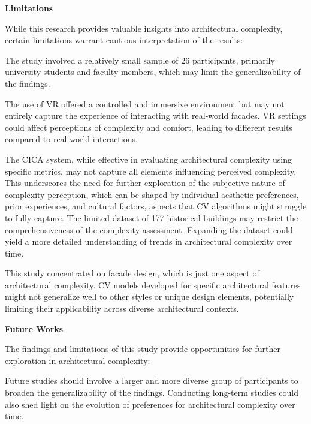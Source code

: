 \textbf{Limitations}

While this research provides valuable insights into architectural complexity, certain limitations warrant cautious interpretation of the results:

The study involved a relatively small sample of 26 participants, primarily university students and faculty members, which may limit the generalizability of the findings.

The use of VR offered a controlled and immersive environment but may not entirely capture the experience of interacting with real-world facades.
VR settings could affect perceptions of complexity and comfort, leading to different results compared to real-world interactions.

The CICA system, while effective in evaluating architectural complexity using specific metrics, may not capture all elements influencing perceived complexity.
This underscores the need for further exploration of the subjective nature of complexity perception, which can be shaped by individual aesthetic preferences, prior experiences, and cultural factors, aspects that CV algorithms might struggle to fully capture.
The limited dataset of 177 historical buildings may restrict the comprehensiveness of the complexity assessment.
Expanding the dataset could yield a more detailed understanding of trends in architectural complexity over time.

This study concentrated on facade design, which is just one aspect of architectural complexity.
CV models developed for specific architectural features might not generalize well to other styles or unique design elements, potentially limiting their applicability across diverse architectural contexts.


\textbf{Future Works}

The findings and limitations of this study provide opportunities for further exploration in architectural complexity:

Future studies should involve a larger and more diverse group of participants to broaden the generalizability of the findings.
Conducting long-term studies could also shed light on the evolution of preferences for architectural complexity over time.

